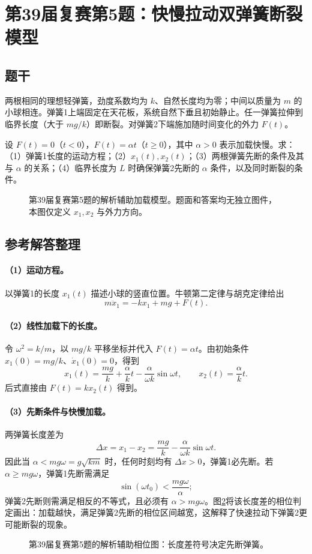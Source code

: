 \section{第39届复赛第5题：快慢拉动双弹簧断裂模型}

\subsection{题干}
两根相同的理想轻弹簧，劲度系数均为 $k$、自然长度均为零；中间以质量为 $m$ 的小球相连。弹簧1上端固定在天花板，系统自然下垂且初始静止。任一弹簧拉伸到临界长度（大于 $mg/k$）即断裂。对弹簧2下端施加随时间变化的外力 $F(t)$。

设 $F(t)=0$（$t<0$），$F(t)=\alpha t$（$t\ge0$），其中 $\alpha>0$ 表示加载快慢。求：（1）弹簧1长度的运动方程；（2）$x_1(t),x_2(t)$；（3）两根弹簧先断的条件及其与 $\alpha$ 的关系；（4）临界长度为 $L$ 时确保弹簧2先断的 $\alpha$ 条件，以及同时断裂的条件。

\begin{figure}[htbp]\centering
  
  \caption{第39届复赛第5题的解析辅助加载模型。题面和答案均无独立图件，本图仅定义 $x_1,x_2$ 与外力方向。}\label{fig:cpho39q05model}
\end{figure}

\subsection{参考解答整理}
\paragraph{（1）运动方程。}
以弹簧1的长度 $x_1(t)$ 描述小球的竖直位置。牛顿第二定律与胡克定律给出
\[
\boxed{m\ddot{x}_1=-kx_1+mg+F(t).}
\]

\paragraph{（2）线性加载下的长度。}
令 $\omega^2=k/m$，以 $mg/k$ 平移坐标并代入 $F(t)=\alpha t$。由初始条件 $x_1(0)=mg/k$、$\dot{x}_1(0)=0$，得到
\[
\boxed{x_1(t)=\frac{mg}{k}+\frac{\alpha}{k}t-\frac{\alpha}{\omega k}\sin\omega t,}
\qquad
\boxed{x_2(t)=\frac{\alpha}{k}t.}
\]
后式直接由 $F(t)=kx_2(t)$ 得到。

\paragraph{（3）先断条件与快慢加载。}
两弹簧长度差为
\[
\Delta x=x_1-x_2=\frac{mg}{k}-\frac{\alpha}{\omega k}\sin\omega t.
\]
因此当 $\alpha<mg\omega=g\sqrt{km}$ 时，任何时刻均有 $\Delta x>0$，弹簧1必先断。若 $\alpha\ge mg\omega$，弹簧1先断需满足
\[
\sin(\omega t_0)<\frac{mg\omega}{\alpha};
\]
弹簧2先断则需满足相反的不等式，且必须有 $\alpha>mg\omega$。图\ref{fig:cpho39q05phase}将该长度差的相位判定画出：加载越快，满足弹簧2先断的相位区间越宽，这解释了快速拉动下弹簧2更可能断裂的现象。
\begin{figure}[htbp]\centering
  
  \caption{第39届复赛第5题的解析辅助相位图：长度差符号决定先断弹簧。}\label{fig:cpho39q05phase}
\end{figure}

